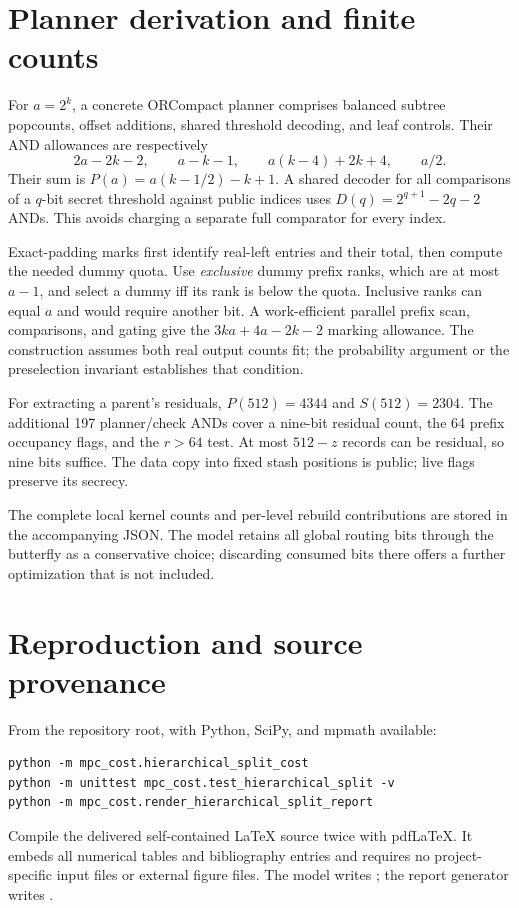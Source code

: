 \documentclass[11pt]{article}
\begin{document}
\appendix
\section{Planner derivation and finite counts}\label{app:planner}
For $a=2^k$, a concrete ORCompact planner comprises balanced subtree
popcounts, offset additions, shared threshold decoding, and leaf controls.
Their AND allowances are respectively
\[
 2a-2k-2,\qquad a-k-1,\qquad a(k-4)+2k+4,\qquad a/2.
\]
Their sum is $P(a)=a(k-1/2)-k+1$. A shared decoder for all comparisons
of a $q$-bit secret threshold against public indices uses
$D(q)=2^{q+1}-2q-2$ ANDs. This avoids charging a separate full comparator
for every index.

Exact-padding marks first identify real-left entries and their total,
then compute the needed dummy quota. Use \emph{exclusive} dummy prefix
ranks, which are at most $a-1$, and select a dummy iff its rank is below
the quota. Inclusive ranks can equal $a$ and would require another bit.
A work-efficient parallel prefix scan, comparisons, and gating give the
$3ka+4a-2k-2$ marking allowance. The construction assumes both real
output counts fit; the probability argument or the preselection invariant
establishes that condition.

For extracting a parent's residuals, $P(512)=4344$ and $S(512)=2304$.
The additional 197 planner/check ANDs cover a nine-bit residual count,
the 64 prefix occupancy flags, and the $r>64$ test. At most $512-z$
records can be residual, so nine bits suffice. The data copy into fixed
stash positions is public; live flags preserve its secrecy.

The complete local kernel counts and per-level rebuild contributions are
stored in the accompanying JSON. The model retains all global routing
bits through the butterfly as a conservative choice; discarding consumed
bits there offers a further optimization that is not included.

\section{Reproduction and source provenance}
From the repository root, with Python, SciPy, and mpmath available:
\begin{verbatim}
python -m mpc_cost.hierarchical_split_cost
python -m unittest mpc_cost.test_hierarchical_split -v
python -m mpc_cost.render_hierarchical_split_report
\end{verbatim}
Compile the delivered self-contained LaTeX source twice with pdfLaTeX.
It embeds all numerical tables and bibliography entries and requires no
project-specific input files or external figure files. The model writes
; the report
generator writes .
\end{document}
